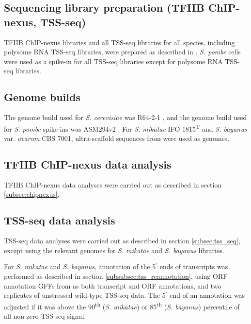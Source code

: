 \subsection{Sequencing library preparation (TFIIB ChIP-nexus, TSS-seq)}

TFIIB ChIP-nexus libraries and all TSS-seq libraries for all species, including polysome RNA TSS-seq libraries, were prepared as described in \citet{doris2018}.
\textit{S. pombe} cells were used as a spike-in for all TSS-seq libraries except for polysome RNA TSS-seq libraries.

\subsection{Genome builds}

The genome build used for \textit{S. cerevisiae} was R64-2-1 \citep{engel2014}, and the genome build used for \textit{S. pombe} spike-ins was ASM294v2 \citep{wood2002}.
For \textit{S. mikatae }IFO 1815\textsuperscript{T} and \textit{S. bayanus} var. \textit{uvarum }CBS 7001, ultra-scaffold sequences from \citet{scannell11} were used as genomes.

\subsection{TFIIB ChIP-nexus data analysis}

TFIIB ChIP-nexus data analyses were carried out as described in section \ref{subsec:chipnexus}.

\subsection{TSS-seq data analysis}

TSS-seq data analyses were carried out as described in section \ref{subsec:tss_seq}, except using the relevant genomes for \textit{S. mikatae} and \textit{S. bayanus} libraries.

For \textit{S. mikatae} and \textit{S. bayanus}, annotation of the 5$^\prime$ ends of transcripts was performed as described in section \ref{subsubsec:tss_reannotation}, using ORF annotation GFFs from \citet{scannell11} as both transcript and ORF annotations, and two replicates of unstressed wild-type TSS-seq data.
The 5$^\prime$ end of an annotation was adjusted if it was above the 90\textsuperscript{th} (\textit{S. mikatae}) or 85\textsuperscript{th} (\textit{S. bayanus}) percentile of all non-zero TSS-seq signal.


